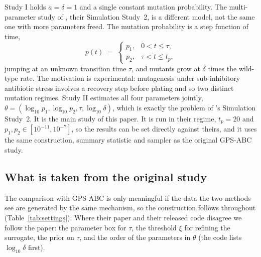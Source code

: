 \documentclass[sn-basic,iicol,pdflatex]{sn-jnl}
\begin{document}
Study I holds $a=\delta=1$ and a single constant mutation probability. The
multi-parameter study of \citet{lu2023}, their Simulation Study~2, is a
different model, not the same one with more parameters freed. The mutation
probability is a step function of time,
\begin{equation}
p(t) \;=\;
\begin{cases}
p_1, & 0 < t \le \tau,\\[2pt]
p_2, & \tau < t \le t_p,
\end{cases}
\label{eq:twostage}
\end{equation}
jumping at an unknown transition time $\tau$, and mutants grow at $\delta$ times
the wild-type rate. The motivation is experimental: mutagenesis under
sub-inhibitory antibiotic stress involves a recovery step before plating and so
two distinct mutation regimes. Study II estimates all four parameters jointly,
$\theta=(\log_{10}p_1,\log_{10}p_2,\tau,\log_{10}\delta)$, which is exactly the
problem of \citeauthor{lu2023}'s Simulation Study~2. It is the main study of this
paper. It is run in their regime, $t_p=20$ and $p_1,p_2\in[10^{-11},10^{-7}]$, so
the results can be set directly against theirs, and it uses the same
construction, summary statistic and sampler as the original GPS-ABC study.

\subsection{What is taken from the original study}
\label{sec:groundtruth3D}

The comparison with GPS-ABC is only meaningful if the data the two methods see
are generated by the same mechanism, so the construction follows \citeauthor{lu2023}
throughout (Table~\ref{tab:settings}). Where their paper and their released code
disagree we follow the paper: the parameter box for $\tau$, the threshold $\xi$
for refining the surrogate, the prior on $\tau$, and the order of the
parameters in $\theta$ (the code lists $\log_{10}\delta$ first).
\end{document}
